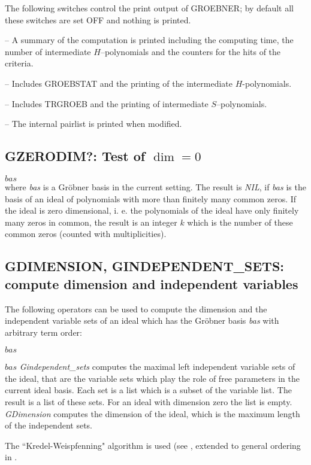 The following switches control the print output of GROEBNER; by
default all these switches are set OFF and nothing is printed.
\begin{description}
\item[GROEBSTAT] -- A summary of the computation is printed
including the computing time, the number of intermediate
$H$--polynomials and the counters for the hits of the criteria.

\item[TRGROEB] -- Includes GROEBSTAT and the printing of the
intermediate $H$-polynomials.

\item[TRGROEBS] -- Includes TRGROEB and the printing of
intermediate $S$--poly\-nomials.

\item[TRGROEB1] -- The internal pairlist is printed when modified.
\end{description}

\subsection{GZERODIM?: Test of $\dim = 0$}
\begin{description}
\item[{\it GZERODIM}!?] $bas$ \\
where {\it bas} is a Gr\"obner basis in the current setting.
The result is {\it NIL}, if {\it bas} is the
basis of an ideal of polynomials with more than finitely many common zeros.
If the ideal is zero dimensional, i. e. the polynomials of the ideal have only
finitely many zeros in common, the result is an integer $k$ which is the number
of these common zeros (counted with multiplicities).
\end{description}

\subsection{GDIMENSION, GINDEPENDENT\_SETS: compute dimension and
independent variables}
The following operators can be used to compute the dimension
and the independent variable sets of an ideal which has the
Gr\"obner basis {\it bas} with arbitrary term order:
\begin{description}
\item[Gdimension]$bas$
\item[Gindependent\_sets]$bas$
{\it Gindependent\_sets} computes the maximal
left independent variable sets of the ideal, that are
the variable sets which play the role of free parameters in the
current ideal basis. Each set is a list which is a subset of the
variable list. The result is a list of these sets. For an
ideal with dimension zero the list is empty.
{\it GDimension} computes the dimension of the ideal,
which is the maximum length of the independent sets.
\end{description}
The ``Kredel-Weispfenning" algorithm is used (see \cite{Kredel:88a},
extended to general ordering in \cite{BeWei:93}.

